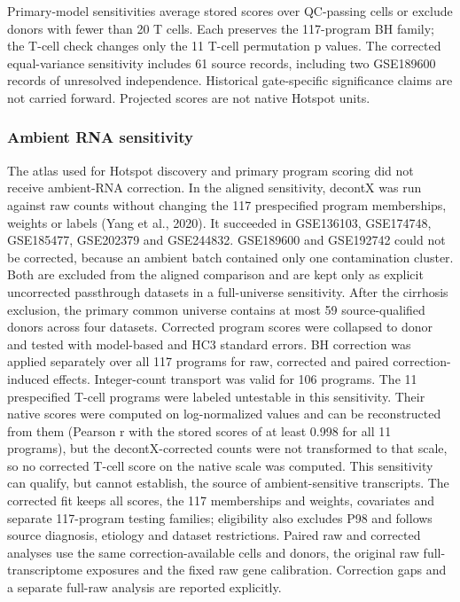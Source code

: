 Primary-model sensitivities average stored scores over QC-passing cells or exclude donors with fewer than 20 T cells. Each preserves the 117-program BH family; the T-cell check changes only the 11 T-cell permutation p values. The corrected equal-variance sensitivity includes 61 source records, including two GSE189600 records of unresolved independence. Historical gate-specific significance claims are not carried forward. Projected scores are not native Hotspot units.

\subsubsection{Ambient RNA sensitivity}\label{ambient-rna-sensitivity}

The atlas used for Hotspot discovery and primary program scoring did not receive ambient-RNA correction. In the aligned sensitivity, decontX was run against raw counts without changing the 117 prespecified program memberships, weights or labels (Yang et al., 2020). It succeeded in GSE136103, GSE174748, GSE185477, GSE202379 and GSE244832. GSE189600 and GSE192742 could not be corrected, because an ambient batch contained only one contamination cluster. Both are excluded from the aligned comparison and are kept only as explicit uncorrected passthrough datasets in a full-universe sensitivity. After the cirrhosis exclusion, the primary common universe contains at most 59 source-qualified donors across four datasets. Corrected program scores were collapsed to donor and tested with model-based and HC3 standard errors. BH correction was applied separately over all 117 programs for raw, corrected and paired correction-induced effects. Integer-count transport was valid for 106 programs. The 11 prespecified T-cell programs were labeled untestable in this sensitivity. Their native scores were computed on log-normalized values and can be reconstructed from them (Pearson r with the stored scores of at least 0.998 for all 11 programs), but the decontX-corrected counts were not transformed to that scale, so no corrected T-cell score on the native scale was computed. This sensitivity can qualify, but cannot establish, the source of ambient-sensitive transcripts. The corrected fit keeps all scores, the 117 memberships and weights, covariates and separate 117-program testing families; eligibility also excludes P98 and follows source diagnosis, etiology and dataset restrictions. Paired raw and corrected analyses use the same correction-available cells and donors, the original raw full-transcriptome exposures and the fixed raw gene calibration. Correction gaps and a separate full-raw analysis are reported explicitly.

